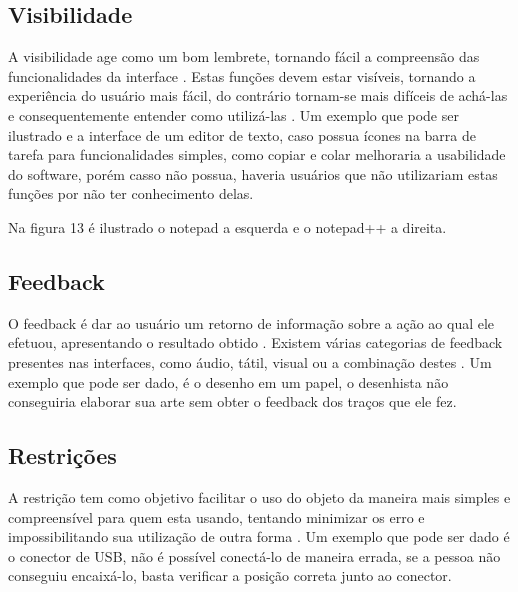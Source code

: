 \documentclass[12pt,oneside,a4paper,chapter=TITLE,section=TITLE,sumario=tradicional]{abntex2}
\begin{document}
\subsection{Visibilidade}
\label{sec:visibilidade}

A visibilidade age como um bom lembrete, tornando fácil a compreensão das funcionalidades da interface \cite{norman2002}. Estas funções devem estar visíveis, tornando a experiência do usuário mais fácil, do contrário tornam-se mais difíceis de achá-las e consequentemente entender como utilizá-las \cite{agni2015}. Um exemplo que pode ser ilustrado e a interface de um editor de texto, caso possua ícones na barra de tarefa para funcionalidades simples, como copiar e colar melhoraria a usabilidade do software, porém casso não possua, haveria usuários que não utilizariam estas funções por não ter conhecimento delas.

Na figura 13 é ilustrado o notepad a esquerda e o notepad++ a direita.

\begin{figure}[htb]
\end{figure}

\subsection{Feedback}
\label{sec:feedback}

O feedback é dar ao usuário um retorno de informação sobre a ação ao qual ele efetuou, apresentando o resultado obtido \cite{norman2002}. Existem várias categorias de feedback presentes nas interfaces, como áudio, tátil, visual ou a combinação destes \cite{agni2015}. Um exemplo que pode ser dado, é o desenho em um papel, o desenhista não conseguiria elaborar sua arte sem obter o feedback dos traços que ele fez.

\subsection{Restrições}
\label{sec:restricoes}

A restrição tem como objetivo facilitar o uso do objeto da maneira mais simples e compreensível para quem esta usando, tentando minimizar os erro e impossibilitando sua utilização de outra forma \cite{norman2002}. Um exemplo que pode ser dado é o conector de USB, não é possível conectá-lo de maneira errada, se a pessoa não conseguiu encaixá-lo, basta verificar a posição correta junto ao conector.
\end{document}
